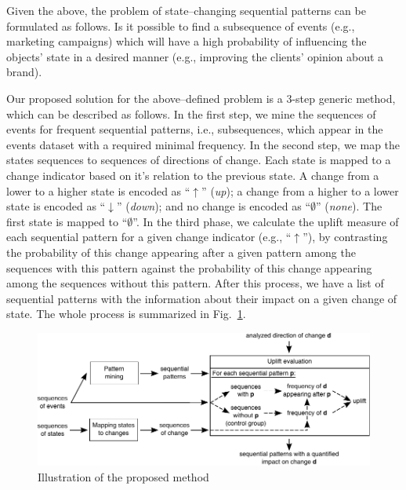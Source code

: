 \documentclass[runningheads,a4paper]{llncs}
\begin{document}
Given the above, the problem of state--changing sequential patterns can be formulated as follows.
Is it possible to find a subsequence of events (e.g., marketing campaigns) which will have a high probability of influencing the objects' state in a desired manner (e.g., improving the clients' opinion about a brand).

Our proposed solution for the above--defined problem is a 3-step generic method, which can be described as follows.
In the first step, we mine the sequences of events for frequent sequential patterns, i.e., subsequences, which appear in the events dataset with a required minimal frequency.
In the second step, we map the states sequences to sequences of directions of change.
Each state is mapped to a change indicator based on it's relation to the previous state.
A change from a lower to a higher state is encoded as ``$\uparrow$'' (\textit{up}); a change from a higher to a lower state is encoded as ``$\downarrow$'' (\textit{down}); and no change is encoded as ``$\emptyset$'' (\textit{none}).
The first state is mapped to ``$\emptyset$''.
In the third phase, we calculate the uplift measure of each sequential pattern for a given change indicator (e.g., ``$\uparrow$''), by contrasting the probability of this change appearing after a given pattern among the sequences with this pattern against the probability of this change appearing among the sequences without this pattern.
After this process, we have a list of sequential patterns with the information about their impact on a given change of state.
The whole process is summarized in Fig.~\ref{fig:concept}.

\begin{figure}[!ht]
	\centering
		\includegraphics[width=\textwidth]{images/concept}
	\caption{Illustration of the proposed method}
	\label{fig:concept}
\end{figure}
\end{document}
